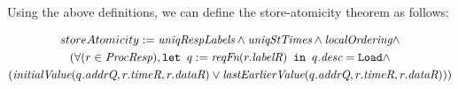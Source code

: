 Using the above definitions, we can define the store-atomicity theorem as follows:
\begin{thm}
\small
\begin{multline*}
storeAtomicity := 
\textit{uniqRespLabels} \wedge
\textit{uniqStTimes} \wedge \textit{localOrdering} \wedge \\
(\forall (r \in \textit{ProcResp}), \texttt{let } q := \textit{reqFn}(r.\textit{labelR}) \texttt{ in } q.\textit{desc} = \texttt{Load} \wedge \\
(\textit{initialValue}(q.\textit{addrQ}, r.\textit{timeR}, r.\textit{dataR}) \vee \textit{lastEarlierValue}(q.\textit{addrQ}, r.\textit{timeR}, r.\textit{dataR})))
\end{multline*}
\end{thm}
